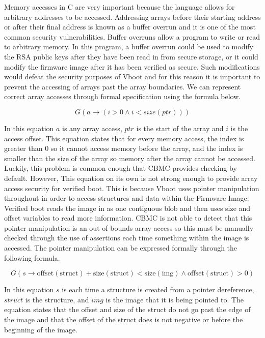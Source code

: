 \documentclass[../report.tex]{subfiles}
\begin{document}
Memory accesses in C are very important because the language allows for arbitrary addresses to be accessed. 
Addressing arrays before their starting address or after their final address is known as a buffer overrun and it is one of the most common security vulnerabilities. 
Buffer overruns allow a program to write or read to arbitrary memory. 
In this program, a buffer overrun could be used to modify the RSA public keys after they have been read in from secure storage, or it could modify the firmware image after it has been verified as secure. 
Such modifications would defeat the security purposes of Vboot and for this reason it is important to prevent the accessing of arrays past the array boundaries.
We can represent correct array accesses through formal specification using the formula below.

\begin{equation}
    G(a \to (i > 0 \land i < size(ptr)))
\end{equation}

In this equation $a$ is any array access, $ptr$ is the start of the array and $i$ is the access offset.
This equation states that for every memory access, the index is greater than 0 so it cannot access memory before the array,  and the index is smaller than the size of the array so memory after the array cannot be accessed.
Luckily, this problem is common enough that CBMC provides checking by default.
However, This equation on its own is not strong enough to provide array access security for verified boot. 
This is because Vboot uses pointer manipulation throughout in order to access structures and data within the Firmware Image. 
Verified boot reads the image in as one contiguous blob and then uses size and offset variables to read more information.
CBMC is not able to detect that this pointer manipulation is an out of bounds array access so this must be manually checked through the use of assertions each time something within the image is accessed.
The pointer manipulation can be expressed formally through the following formula.

\begin{equation}
    G(s \to \text{offset}(\text{struct}) + \text{size}(\text{struct}) <
    \text{size}(\text{img}) \land \text{offset}(\text{struct}) > 0)
\end{equation}

In this equation $s$ is each time a structure is created from a pointer dereference, $struct$ is the structure, and $img$ is the image that it is being pointed to.
The equation states that the offset and size of the struct do not go past the edge of the image and that the offset of the struct does is not negative or before the beginning of the image.
\end{document}
